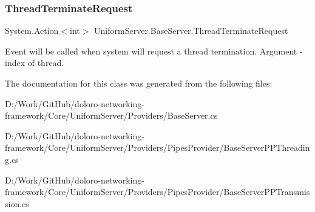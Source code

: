 \mbox{\label{class_uniform_server_1_1_base_server_a889c3aaa1cca7f4a9a4e32617516f4be}} 
\subsubsection{\texorpdfstring{Thread\+Terminate\+Request}{ThreadTerminateRequest}}
{\footnotesize\ttfamily System.\+Action$<$int$>$ Uniform\+Server.\+Base\+Server.\+Thread\+Terminate\+Request\hspace{0.3cm}{\ttfamily [static]}}



Event will be called when system will request a thread termination. Argument -\/ index of thread. 



The documentation for this class was generated from the following files\+:\begin{DoxyCompactItemize}
\item 
D\+:/\+Work/\+Git\+Hub/doloro-\/networking-\/framework/\+Core/\+Uniform\+Server/\+Providers/Base\+Server.\+cs\item 
D\+:/\+Work/\+Git\+Hub/doloro-\/networking-\/framework/\+Core/\+Uniform\+Server/\+Providers/\+Pipes\+Provider/Base\+Server\+P\+P\+Threading.\+cs\item 
D\+:/\+Work/\+Git\+Hub/doloro-\/networking-\/framework/\+Core/\+Uniform\+Server/\+Providers/\+Pipes\+Provider/Base\+Server\+P\+P\+Transmission.\+cs\end{DoxyCompactItemize}
